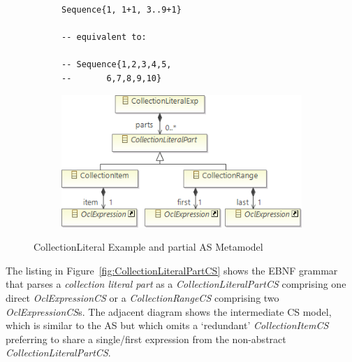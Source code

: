 \documentclass{llncs}
\begin{document}
\begin{figure}[htbp]
\centering
\begin{subfigure}{0.354\textwidth}
  \centering
\begin{lstlisting}[label=lst:CollectionLiteralExpExample, language=OCL]
Sequence{1, 1+1, 3..9+1}

-- equivalent to:

-- Sequence{1,2,3,4,5,
--       6,7,8,9,10}
\end{lstlisting} 
\end{subfigure}%
\begin{subfigure}{0.65\textwidth}
  \centering
  \includegraphics[scale=0.5]{images/CollectionLiteralPartAS.png}
\end{subfigure}
\caption{CollectionLiteral Example and partial AS Metamodel}
\label{fig:CollectionLiteralPartAS}
\end{figure}

The listing in Figure~\ref{fig:CollectionLiteralPartCS} shows the EBNF grammar that parses a \textit{collection literal part} as a \emph{CollectionLiteralPartCS} comprising one direct \emph{OclExpressionCS} or a \emph{CollectionRangeCS} comprising two \emph{OclExpressionCS}s. The adjacent diagram shows the intermediate CS model, which is similar to the AS but which omits a `redundant' \emph{CollectionItemCS} preferring to share a single/first expression from the non-abstract \emph{CollectionLiteralPartCS}.
\end{document}
